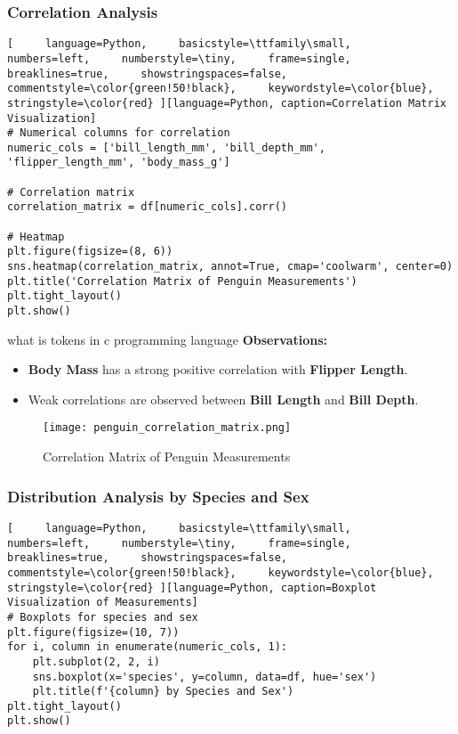 \documentclass[12pt]{article}
\begin{document}
\begin{itemize}
\subsubsection*{Correlation Analysis}

\begin{lstlisting}[     language=Python,     basicstyle=\ttfamily\small,     numbers=left,     numberstyle=\tiny,     frame=single,     breaklines=true,     showstringspaces=false,     commentstyle=\color{green!50!black},     keywordstyle=\color{blue},     stringstyle=\color{red} ][language=Python, caption=Correlation Matrix Visualization]
# Numerical columns for correlation
numeric_cols = ['bill_length_mm', 'bill_depth_mm', 'flipper_length_mm', 'body_mass_g']

# Correlation matrix
correlation_matrix = df[numeric_cols].corr()

# Heatmap
plt.figure(figsize=(8, 6))
sns.heatmap(correlation_matrix, annot=True, cmap='coolwarm', center=0)
plt.title('Correlation Matrix of Penguin Measurements')
plt.tight_layout()
plt.show()
\end{lstlisting}
what is tokens in c programming language
\textbf{Observations:}
\begin{itemize}
    \item \textbf{Body Mass} has a strong positive correlation with \textbf{Flipper Length}.
    \item Weak correlations are observed between \textbf{Bill Length} and \textbf{Bill Depth}.
\end{itemize}

\begin{figure}[H]
    \centering
    \texttt{[image: penguin\_correlation\_matrix.png]}
    \caption{Correlation Matrix of Penguin Measurements}
\end{figure}

\subsubsection*{Distribution Analysis by Species and Sex}

\begin{lstlisting}[     language=Python,     basicstyle=\ttfamily\small,     numbers=left,     numberstyle=\tiny,     frame=single,     breaklines=true,     showstringspaces=false,     commentstyle=\color{green!50!black},     keywordstyle=\color{blue},     stringstyle=\color{red} ][language=Python, caption=Boxplot Visualization of Measurements]
# Boxplots for species and sex
plt.figure(figsize=(10, 7))
for i, column in enumerate(numeric_cols, 1):
    plt.subplot(2, 2, i)
    sns.boxplot(x='species', y=column, data=df, hue='sex')
    plt.title(f'{column} by Species and Sex')
plt.tight_layout()
plt.show()
\end{lstlisting}


\end{itemize}
\end{document}

